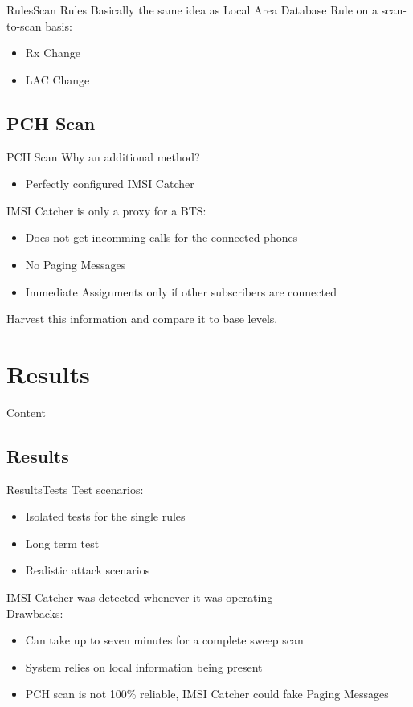\documentclass{beamer}
\newcommand{\tocsection}[1]{
  \section{#1}
  \begin{frame}{Content}
    \tableofcontents[sectionstyle=show/shaded, subsectionstyle=hide/hide/hide]%
  \end{frame}
 }
\begin{document}
\begin{frame}{Rules}{Scan Rules}
Basically the same idea as Local Area Database Rule on a scan-to-scan basis:
\begin{itemize}
    \item Rx Change
    \item LAC Change
\end{itemize}
\end{frame}

\subsection{PCH Scan}
\begin{frame}{PCH Scan}
Why an additional method?
\begin{itemize}
    \item Perfectly configured IMSI Catcher
\end{itemize}
\vspace{.8cm}
IMSI Catcher is only a proxy for a BTS:
\begin{itemize}
    \item Does not get incomming calls for the connected phones
    \item No Paging Messages
    \item Immediate Assignments only if other subscribers are connected
\end{itemize}
Harvest this information and compare it to base levels.
\end{frame}

\tocsection{Results}
\subsection{Results}
\begin{frame}{Results}{Tests}
Test scenarios:
\begin{itemize}
    \item Isolated tests for the single rules
    \item Long term test
    \item Realistic attack scenarios
\end{itemize}
IMSI Catcher was detected whenever it was operating\\
\vspace{.5cm}
Drawbacks:
\begin{itemize}
    \item Can take up to seven minutes for a complete sweep scan
    \item System relies on local information being present
    \item PCH scan is not 100\% reliable, IMSI Catcher could fake Paging Messages
\end{itemize}
\end{frame}
\end{document}
